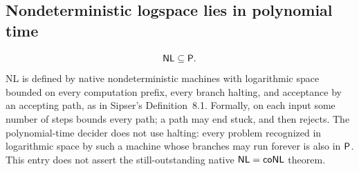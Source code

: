 \begin{result}
\subsection{Nondeterministic logspace lies in polynomial time}
\[
\mathsf{NL}\subseteq\mathsf{P}.
\]
NL is defined by native nondeterministic machines with logarithmic space bounded
on every computation prefix, every branch halting, and acceptance by an accepting
path, as in Sipser's Definition~8.1. Formally, on each input some number of steps
bounds every path; a path may end stuck, and then rejects. The polynomial-time
decider does not use halting: every problem recognized in logarithmic space by
such a machine whose branches may run forever is also in $\mathsf{P}$. This entry does
not assert the still-outstanding native $\mathsf{NL}=\mathsf{coNL}$ theorem.\citep[Section 8.5]{Sipser2013}
\end{result}

